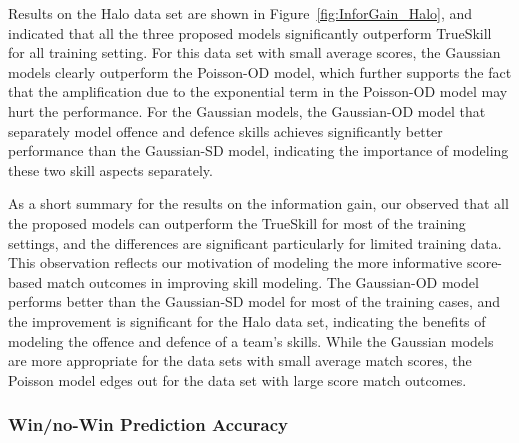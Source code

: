 \begin{center}
\begin{figure*}[htbp!]
 \centering
\caption{\small Results on the AFL data set, evaluated
using information gain. Error bars indicate
95\% confidence intervals.}
\label{fig:InforGain_AFL}
\end{figure*}
\end{center}

Results on the Halo data set are shown in Figure~\ref{fig:InforGain_Halo}, and indicated that all the three proposed models significantly outperform TrueSkill for all training setting. For this data set with small average scores, the Gaussian models clearly outperform the Poisson-OD model, which further supports the fact that the amplification due to the exponential term in the Poisson-OD model may hurt the performance. For the Gaussian models, the Gaussian-OD model that separately model offence and defence skills achieves significantly better performance than the Gaussian-SD model, indicating the importance of modeling these two skill aspects separately. 

\begin{center}
\begin{figure*}[t!]
 \centering
\caption{\small Results on the Halo 2 data set, evaluated
using information gain. Error bars indicate
95\% confidence intervals.}
\label{fig:InforGain_Halo}
\end{figure*}
\end{center}

As a short summary for the results on the information gain, our observed that all the proposed models can outperform the TrueSkill for most of the training settings, and the differences are significant particularly for limited training data. This observation reflects our motivation of modeling the more informative score-based match outcomes in improving skill modeling. The Gaussian-OD model performs better than the Gaussian-SD model for most of the training cases, and the improvement is significant for the Halo data set, indicating the benefits of modeling the offence and defence of a team's skills. While the Gaussian models are more appropriate for the data sets with small average match scores, the Poisson model edges out for the data set with large score match outcomes. 

\subsubsection{Win/no-Win Prediction Accuracy }

